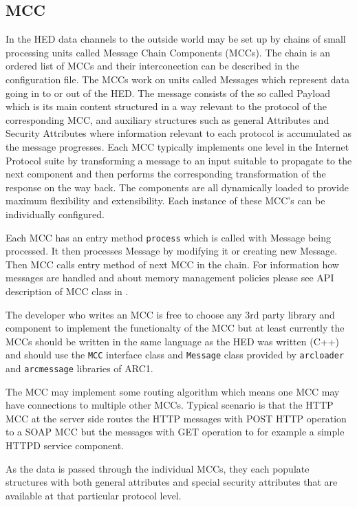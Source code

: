 \documentclass{book}
\begin{document}
\subsection{MCC}

In the HED data channels to the outside world may be set up by chains of small processing units called Message Chain Components (MCCs). The chain is an ordered list of MCCs and their interconection can be described in the configuration file. The MCCs work on units called Messages which represent data going in to or out of the HED. The message consists of the so called Payload which is its main content structured in a way relevant to the protocol of the corresponding MCC, and auxiliary structures such as general Attributes and Security Attributes where information relevant to each protocol is accumulated as the message progresses. Each MCC typically implements one level in the Internet Protocol suite by transforming a message to an input suitable to propagate to the next component and then performs the corresponding transformation of the response on the way back. The components are all dynamically loaded to provide maximum flexibility and extensibility. Each instance of these MCC's can be individually configured.

Each MCC has an entry method \texttt{process} which is called with Message being processed. It then processes Message by modifying it or creating new Message. Then MCC calls entry method of next MCC in the chain. For information how messages are handled and about memory management policies please see API description of MCC class in \cite{hed-api}.

The developer who writes an MCC is free to choose any 3rd party library and component to implement the functionalty of the MCC but at least currently the MCCs should be written in the same language as the HED was written (C++) and should use the \texttt{MCC} interface class and \texttt{Message} class provided by \texttt{arcloader} and \texttt{arcmessage} libraries of ARC1.

The MCC may implement some routing algorithm which means one MCC may have connections to multiple other MCCs. Typical scenario is that the HTTP MCC at the server side routes the HTTP messages with POST HTTP operation to a SOAP MCC but the messages with GET operation to for example a simple HTTPD service component.

As the data is passed through the individual MCCs, they each populate structures with both general attributes and special security attributes that are available at that particular protocol level.
\end{document}
